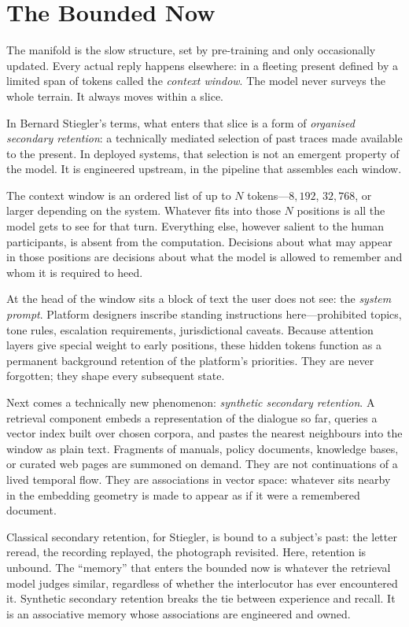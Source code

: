 \documentclass[12pt,a4paper]{article}
\begin{document}
\section{The Bounded Now}

The manifold is the slow structure, set by pre-training and only occasionally updated. Every actual reply happens elsewhere: in a fleeting present defined by a limited span of tokens called the \emph{context window}. The model never surveys the whole terrain. It always moves within a slice.

In Bernard Stiegler's terms, what enters that slice is a form of \emph{organised secondary retention}: a technically mediated selection of past traces made available to the present. In deployed systems, that selection is not an emergent property of the model. It is engineered upstream, in the pipeline that assembles each window.

The context window is an ordered list of up to $N$ tokens---$8{,}192$, $32{,}768$, or larger depending on the system. Whatever fits into those $N$ positions is all the model gets to see for that turn. Everything else, however salient to the human participants, is absent from the computation. Decisions about what may appear in those positions are decisions about what the model is allowed to remember and whom it is required to heed.

At the head of the window sits a block of text the user does not see: the \emph{system prompt}. Platform designers inscribe standing instructions here---prohibited topics, tone rules, escalation requirements, jurisdictional caveats. Because attention layers give special weight to early positions, these hidden tokens function as a permanent background retention of the platform's priorities. They are never forgotten; they shape every subsequent state.

Next comes a technically new phenomenon: \emph{synthetic secondary retention}. A retrieval component embeds a representation of the dialogue so far, queries a vector index built over chosen corpora, and pastes the nearest neighbours into the window as plain text. Fragments of manuals, policy documents, knowledge bases, or curated web pages are summoned on demand. They are not continuations of a lived temporal flow. They are associations in vector space: whatever sits nearby in the embedding geometry is made to appear as if it were a remembered document.

Classical secondary retention, for Stiegler, is bound to a subject's past: the letter reread, the recording replayed, the photograph revisited. Here, retention is unbound. The ``memory'' that enters the bounded now is whatever the retrieval model judges similar, regardless of whether the interlocutor has ever encountered it. Synthetic secondary retention breaks the tie between experience and recall. It is an associative memory whose associations are engineered and owned.
\end{document}
